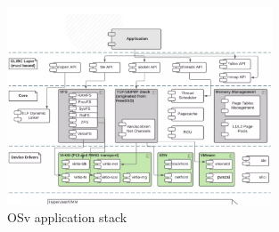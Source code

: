 \begin{figure}[htbp!] 
  \centering    
  \includegraphics[width=0.7\textwidth]{OSvStack}
  \caption[OSv]{OSv application stack \cite{OSvDiagram}}
  \label{fig:OSv}
  \end{figure}



